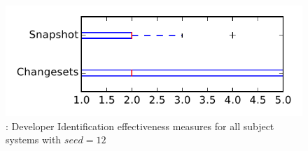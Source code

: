 
\begin{figure}
\centering
\includegraphics[height=0.4\textheight]{figures/dit_seed/rq1_tiny_12}
\caption{\rtwo: Developer Identification effectiveness measures for all subject systems with $seed=12$}
\label{fig:dit_seed:rq1:tiny}
\end{figure}
